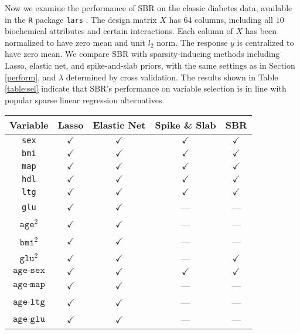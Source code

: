 \documentclass[11pt]{article}%
\numberwithin{equation}{section}
\theoremstyle{plain}
\begin{document}
Now we examine the performance of SBR on the classic diabetes data, available in the \texttt{R} package \texttt{lars} \citep{efron2004}.  The design matrix $X$ has $64$ columns, including all $10$ biochemical attributes and certain interactions.  Each column of $X$ has been normalized to have zero mean and unit $l_2$ norm.  The response $y$ is centralized to have zero mean.  We compare SBR with sparsity-inducing methods including Lasso, elastic net, and spike-and-slab priors, with the same settings as in Section \ref{perform}, and $\lambda$ determined by cross validation.  The results shown in Table \ref{table:sel} indicate that SBR's performance on variable selection is in line with popular sparse linear regression alternatives.

\begin{table}[h!]
\centering
\begin{tabular}{| C || C  | C | C | C |} 
 \hline
 Variable & Lasso & Elastic Net & Spike \& Slab & SBR\\
 \hline\hline
 \texttt{sex} 							& $\checkmark$ & $\checkmark$ & $\checkmark$ & $\checkmark$\\ 
 \texttt{bmi} 							& $\checkmark$ & $\checkmark$ & $\checkmark$ & $\checkmark$\\
 \texttt{map} 							& $\checkmark$ & $\checkmark$ & $\checkmark$ & $\checkmark$\\
 \texttt{hdl} 							& $\checkmark$ & $\checkmark$ & $\checkmark$ & $\checkmark$\\
 \texttt{ltg} 							& $\checkmark$ & $\checkmark$ & $\checkmark$ & $\checkmark$\\
 \texttt{glu} 							& $\checkmark$ & $\checkmark$ & --- 		 & ---			     \\
 $\texttt{age}^2$ 						& $\checkmark$ & $\checkmark$ & --- 		 & ---			     \\
 $\texttt{bmi}^2$ 						& $\checkmark$ & $\checkmark$ & --- 		 & ---			     \\
 $\texttt{glu}^2$ 						& $\checkmark$ & $\checkmark$ & --- 		 & $\checkmark$   \\
 $\texttt{age}\cdot\texttt{sex}$ 		& $\checkmark$ & $\checkmark$ & $\checkmark$ & $\checkmark$\\
 $\texttt{age}\cdot\texttt{map}$ 		& $\checkmark$ & $\checkmark$ & --- 		 & ---			\\
 $\texttt{age}\cdot\texttt{ltg}$ 		& $\checkmark$ & $\checkmark$ & --- 		 & ---			\\
 $\texttt{age}\cdot\texttt{glu}$ 		& $\checkmark$ & $\checkmark$ & --- 		 & ---			\\

\end{tabular}
\end{table}
\end{document}
